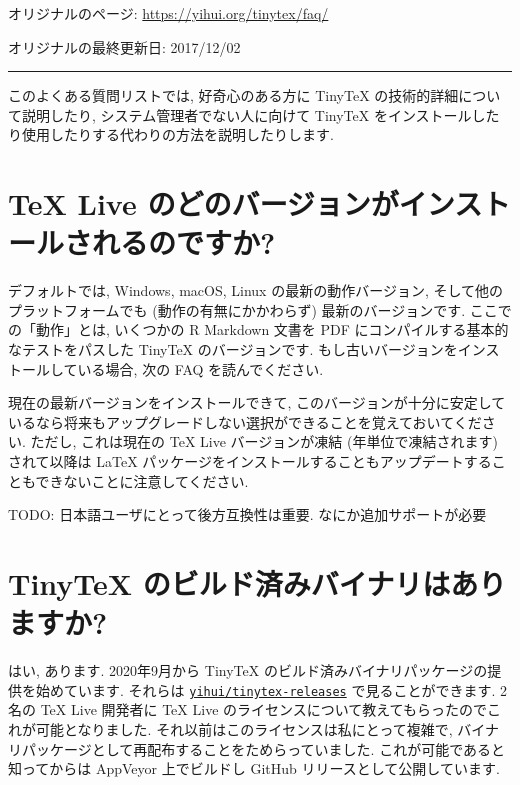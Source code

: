 \documentclass[
  xelatex,ja=standard,jafont=noto]{bxjsreport}
\begin{document}
オリジナルのページ: \url{https://yihui.org/tinytex/faq/}

オリジナルの最終更新日: 2017/12/02

\begin{center}\rule{0.5\linewidth}{0.5pt}\end{center}

このよくある質問リストでは, 好奇心のある方に TinyTeX
の技術的詳細について説明したり, システム管理者でない人に向けて TinyTeX
をインストールしたり使用したりする代わりの方法を説明したりします.

\hypertarget{tex-live-ux306eux3069ux306eux30d0ux30fcux30b8ux30e7ux30f3ux304cux30a4ux30f3ux30b9ux30c8ux30fcux30ebux3055ux308cux308bux306eux3067ux3059ux304b}{%
\section{TeX Live
のどのバージョンがインストールされるのですか?}\label{tex-live-ux306eux3069ux306eux30d0ux30fcux30b8ux30e7ux30f3ux304cux30a4ux30f3ux30b9ux30c8ux30fcux30ebux3055ux308cux308bux306eux3067ux3059ux304b}}

デフォルトでは, Windows, macOS, Linux の最新の動作バージョン,
そして他のプラットフォームでも (動作の有無にかかわらず)
最新のバージョンです. ここでの「動作」とは, いくつかの R Markdown 文書を
PDF にコンパイルする基本的なテストをパスした TinyTeX のバージョンです.
もし古いバージョンをインストールしている場合, 次の FAQ を読んでください.

現在の最新バージョンをインストールできて,
このバージョンが十分に安定しているなら将来もアップグレードしない選択ができることを覚えておいてください.
ただし, これは現在の TeX Live バージョンが凍結 (年単位で凍結されます)
されて以降は LaTeX
パッケージをインストールすることもアップデートすることもできないことに注意してください.

TODO: 日本語ユーザにとって後方互換性は重要. なにか追加サポートが必要

\hypertarget{tinytex-ux306eux30d3ux30ebux30c9ux6e08ux307fux30d0ux30a4ux30caux30eaux306fux3042ux308aux307eux3059ux304b}{%
\section{TinyTeX
のビルド済みバイナリはありますか?}\label{tinytex-ux306eux30d3ux30ebux30c9ux6e08ux307fux30d0ux30a4ux30caux30eaux306fux3042ux308aux307eux3059ux304b}}

はい, あります. 2020年9月から TinyTeX
のビルド済みバイナリパッケージの提供を始めています. それらは
\href{https://github.com/yihui/tinytex-releases}{\texttt{yihui/tinytex-releases}}
で見ることができます. 2名の TeX Live 開発者に TeX Live
のライセンスについて教えてもらったのでこれが可能となりました.
それ以前はこのライセンスは私にとって複雑で,
バイナリパッケージとして再配布することをためらっていました.
これが可能であると知ってからは AppVeyor 上でビルドし GitHub
リリースとして公開しています.
\end{document}
